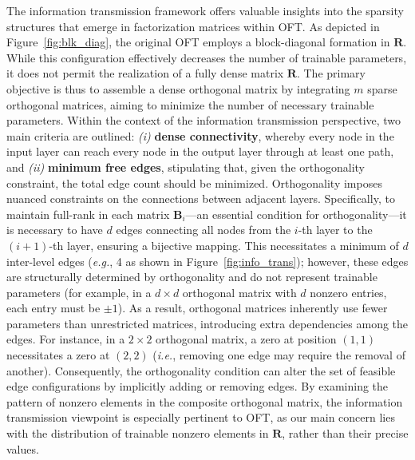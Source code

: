 The information transmission framework offers valuable insights into the sparsity structures that emerge in factorization matrices within OFT. As depicted in Figure~\ref{fig:blk_diag}, the original OFT employs a block-diagonal formation in $\bm{R}$. While this configuration effectively decreases the number of trainable parameters, it does not permit the realization of a fully dense matrix $\bm{R}$. The primary objective is thus to assemble a dense orthogonal matrix by integrating $m$ sparse orthogonal matrices, aiming to minimize the number of necessary trainable parameters. Within the context of the information transmission perspective, two main criteria are outlined: \emph{(i)} \textbf{dense connectivity}, whereby every node in the input layer can reach every node in the output layer through at least one path, and \emph{(ii)} \textbf{minimum free edges}, stipulating that, given the orthogonality constraint, the total edge count should be minimized. Orthogonality imposes nuanced constraints on the connections between adjacent layers. Specifically, to maintain full-rank in each matrix $\bm{B}_i$—an essential condition for orthogonality—it is necessary to have $d$ edges connecting all nodes from the $i$-th layer to the $(i+1)$-th layer, ensuring a bijective mapping. This necessitates a minimum of $d$ inter-level edges (\emph{e.g.}, 4 as shown in Figure~\ref{fig:info_trans}); however, these edges are structurally determined by orthogonality and do not represent trainable parameters (for example, in a $d\times d$ orthogonal matrix with $d$ nonzero entries, each entry must be $\pm 1$). As a result, orthogonal matrices inherently use fewer parameters than unrestricted matrices, introducing extra dependencies among the edges. For instance, in a $2\times 2$ orthogonal matrix, a zero at position $(1,1)$ necessitates a zero at $(2,2)$ (\emph{i.e.}, removing one edge may require the removal of another). Consequently, the orthogonality condition can alter the set of feasible edge configurations by implicitly adding or removing edges. By examining the pattern of nonzero elements in the composite orthogonal matrix, the information transmission viewpoint is especially pertinent to OFT, as our main concern lies with the distribution of trainable nonzero elements in $\bm{R}$, rather than their precise values.

